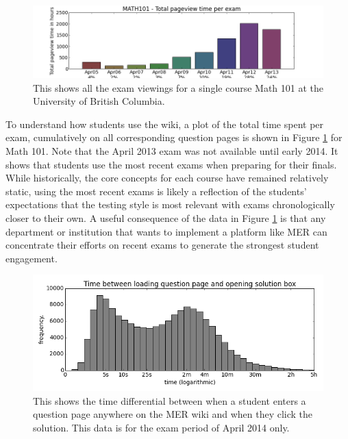 \documentclass{primus}
\begin{document}
\begin{figure}[H]
\centering
\includegraphics[width=\textwidth]{figs/total_pageview_per_exam_101.png}
\caption{This shows all the exam viewings for a single course Math 101 at the University of British Columbia.}\label{fig:total_pageview_per_exam_101}
\end{figure}

\noindent{}To understand how students use the wiki, a plot of the total time spent per exam, cumulatively on all corresponding question pages is shown in Figure \ref{fig:total_pageview_per_exam_101} for Math 101. Note that the April 2013 exam was not available until early 2014. It shows that students use the most recent exams when preparing for their finals. While historically, the core concepts for each course have remained relatively static, using the most recent exams is likely a reflection of the students’ expectations that the testing style is most relevant with exams chronologically closer to their own.  A useful consequence of the data in Figure \ref{fig:total_pageview_per_exam_101} is that any department or institution that wants to implement a platform like MER can concentrate their efforts on recent exams to generate the strongest student engagement.

\begin{figure}[H]
\centering
\includegraphics[width=\textwidth]{figs/2013_Term2_delta_t.png}
\caption{This shows the time differential between when a student enters a question page anywhere on the MER wiki and when they click the solution. This data is for the exam period of April 2014 only.}\label{fig:2013_Term2_delta_t}
\end{figure}
\end{document}
